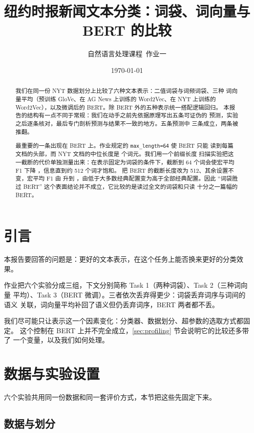 \documentclass[11pt]{article}
\title{纽约时报新闻文本分类：词袋、词向量与 BERT 的比较}
\author{自然语言处理课程\ 作业一}
\date{\today}
\newcommand{\code}[1]{\texttt{\small #1}}
\begin{document}
\maketitle

\begin{abstract}
\noindent
我们在同一份 NYT 数据划分上比较了六种文本表示：二值词袋与词频词袋、三种
词向量平均（预训练 GloVe、在 AG News 上训练的 Word2Vec、在 NYT 上训练的
Word2Vec），以及微调后的 BERT。除 BERT 外的五种表示统一搭配逻辑回归。
本报告的结构有一点不同于常规：我们在动手之前先依据原理写出五条可证伪的
预测，实验之后逐条核对，最后专门剖析预测与结果不一致的地方。五条预测中
三条成立，两条被推翻。

最重要的一条出现在 BERT 上。作业规定的 \code{max\_length=64} 使 BERT 只能
读到每篇文档的头部，而 NYT 文档的中位长度是 \resultMedianTokens{} 个词元。我们用一个前缀长度
扫描实验把这一截断的代价单独测量出来：在表示固定为词袋的条件下，截断到
64 个词会使宏平均 F1 下降 \resultTruncShortLoss{}，信息直到约 512 个词才饱和。
把 BERT 的截断长度改为 512、其余设置不变，宏平均 F1 由 \resultBertFOne{}
升到 \resultBertLenFOne{}，由低于大多数经典配置变为高于全部经典配置。因此
``词袋胜过 BERT'' 这个表面结论并不成立，它比较的是读过全文的词袋和只读
十分之一篇幅的 BERT。
\end{abstract}

\section{引言}

本报告要回答的问题是：更好的文本表示，在这个任务上能否换来更好的分类效果。

作业把六个实验分成三组，下文分别简称 Task 1（两种词袋）、Task 2（三种词向量
平均）、Task 3（BERT 微调）。三者依次丢弃得更少：词袋丢弃词序与词间的语义
关联，词向量平均补回了语义但仍丢弃词序，BERT 两者都不丢。

我们尽可能只让表示这一个因素变化：分类器、数据划分、超参数的选取方式都固定。
这个控制在 BERT 上并不完全成立，\ref{sec:profiling} 节会说明它的比较还多带了
一个变量，以及我们如何处理。

\section{数据与实验设置}\label{sec:setup}

六个实验共用同一份数据和同一套评价方式，本节把这些先固定下来。

\subsection{数据与划分}
\end{document}
